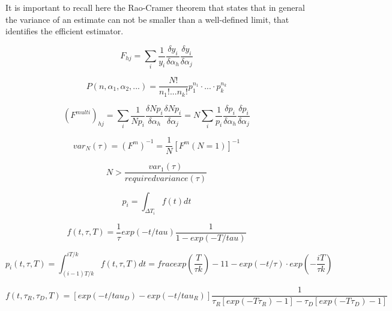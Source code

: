 It is important to recall here the Rao-Cramer theorem 
that states that in general the variance of an estimate can not be smaller than a well-defined limit, that identifies the efficient estimator.

\begin{equation}
F_{hj} = \sum _{i}\frac{1}{y_{i}}\frac{\delta y_{i}}{\delta \alpha _{h}}\frac{\delta y_{i}}{\delta \alpha _{j}}
\end{equation}

\begin{equation}
P(n, \alpha _{1}, \alpha _{2},...) = \frac{N!}{n_{1}!...n_{k}!} p_{1}^{n_{1}}\cdot ... \cdot p_{k}^{n_{k}}
\end{equation}

\begin{equation}
(F^{multi})_{hj} = \sum _{i} \frac{1}{Np_{i}}\frac{\delta Np_{i}}{\delta \alpha _{h}}\frac{\delta Np_{i}}{\delta \alpha _{j}} = N\sum _{i}\frac{1}{p_{i}}\frac{\delta p_{i}}{\delta \alpha _{h}}\frac{\delta p_{i}}{\delta \alpha _{j}}
\end{equation}

\begin{equation}
var_{N}(\tau) = (F^{m})^{-1}=\frac{1}{N}[F^{m}(N=1)]^{-1}
\end{equation}

\begin{equation}
N > \frac{var_{1}(\tau)}{required variance (\tau)}
\end{equation}


\begin{equation}
p_{i} = \int _{\Delta T_{i}} f(t)dt
\end{equation}

\begin{equation}
f(t, \tau , T) = \frac{1}{\tau} exp(-t/tau)\frac{1}{1-exp(-T/tau)} 
\end{equation}

\begin{equation}
p_{i}(t, \tau, T) = \int _{(i-1)T/k} ^{iT/k} f(t, \tau, T)dt = frac{exp(\frac{T}{\tau k}) - 1}{1-exp(- t/\tau)} \cdot exp(-\frac{iT}{\tau k})
\end{equation}

\begin{equation}
f(t, \tau _{R}, \tau _{D}, T) = [exp(-t/tau _{D}) - exp (-t/tau _{R})] \frac{1}{\tau _{R}[exp(-T\tau _{R})-1] - \tau _{D}[exp(-T\tau _{D})-1]}  
\end{equation}


